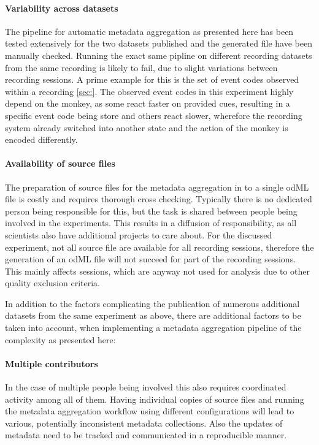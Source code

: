 \paragraph{Variability across datasets}
The pipeline for automatic metadata aggregation as presented here has been tested extensively for the two datasets published and the generated file have been manually checked. Running the exact same pipline on different recording datasets from the same recording is likely to fail, due to slight variations between recording sessions. A prime example for this is the set of event codes observed within a recording \ref{sec:}. The observed event codes in this experiment highly depend on the monkey, as some react faster on provided cues, resulting in a specific event code being store and others react slower, wherefore the recording system already switched into another state and the action of the monkey is encoded differently.

\paragraph{Availability of source files}
The preparation of source files for the metadata aggregation in to a single odML file is costly and requires thorough cross checking. Typically there is no dedicated person being responsible for this, but the task is shared between people being involved in the experiments. This results in a diffusion of responsibility, as all scientists also have additional projects to care about. For the discussed experiment, not all source file are available for all recording sessions, therefore the generation of an odML file will not succeed for part of the recording sessions. This mainly affects sessions, which are anyway not used for analysis due to other quality exclusion criteria.
\newline

In addition to the factors complicating the publication of numerous additional datasets from the same experiment as above, there are additional factors to be taken into account, when implementing a metadata aggregation pipeline of the complexity as presented here:

\paragraph{Multiple contributors}
In the case of multiple people being involved this also requires coordinated activity among all of them. Having individual copies of source files and running the metadata aggregation workflow using different configurations will lead to various, potentially inconsistent metadata collections. Also the updates of metadata need to be tracked and communicated in a reproducible manner.

